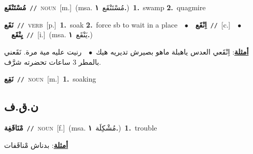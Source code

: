 \documentclass[10pt,a4paper,twoside]{article} %
\begin{document}
\begin{multicols}{2}
{\setlength\topsep{0pt}\textbf{\foreignlanguage{arabic}{مُسْتَنْقَع}}\ {\color{gray}\texttt{//}\color{black}}\ \textsc{noun}\ [m.]\ \color{gray}(msa. \foreignlanguage{arabic}{مُسْتَنْقَع}~\foreignlanguage{arabic}{\textbf{١.}})\color{black}\ \textbf{1.}~swamp  \textbf{2.}~quagmire\ } \vspace{2mm}

{\setlength\topsep{0pt}\textbf{\foreignlanguage{arabic}{نَقَع}}\ {\color{gray}\texttt{//}\color{black}}\ \textsc{verb}\ [p.]\ \textbf{1.}~soak  \textbf{2.}~force sb to wait in a place\ \ $\bullet$\ \ \setlength\topsep{0pt}\textbf{\foreignlanguage{arabic}{اِنْقَع}}\ {\color{gray}\texttt{//}\color{black}}\ [c.]\ \ $\bullet$\ \ \setlength\topsep{0pt}\textbf{\foreignlanguage{arabic}{يِنْقَع}}\ {\color{gray}\texttt{//}\color{black}}\ [i.]\ \color{gray}(msa. \foreignlanguage{arabic}{يَنْقَع}~\foreignlanguage{arabic}{\textbf{١.}})\color{black}\  \begin{flushright}\color{gray}\foreignlanguage{arabic}{\textbf{\underline{\foreignlanguage{arabic}{أمثلة}}}: اِنْقَعي العدس ياهبلة ماهو بصيرش تديريه هيك\ $\bullet$\ \  رنيت عليه مية مرة. نَقَعني بالمطر 3 ساعات تحضرته شرَّف.}\end{flushright}\color{black}} \vspace{2mm}

{\setlength\topsep{0pt}\textbf{\foreignlanguage{arabic}{نَقِع}}\ {\color{gray}\texttt{//}\color{black}}\ \textsc{noun}\ [m.]\ \textbf{1.}~soaking\ } \vspace{2mm}

\vspace{-3mm}
\subsection*{\color{blue}\foreignlanguage{arabic}{ن.ق.ف}\color{blue}{}} 

{\setlength\topsep{0pt}\textbf{\foreignlanguage{arabic}{مْنَاقَفِة}}\ {\color{gray}\texttt{//}\color{black}}\ \textsc{noun}\ [f.]\ \color{gray}(msa. \foreignlanguage{arabic}{مُشْكِلَة}~\foreignlanguage{arabic}{\textbf{١.}})\color{black}\ \textbf{1.}~trouble\  \begin{flushright}\color{gray}\foreignlanguage{arabic}{\textbf{\underline{\foreignlanguage{arabic}{أمثلة}}}: بدناش مْناقَفات}\end{flushright}\color{black}} \vspace{2mm}


\end{multicols}
\end{document}
